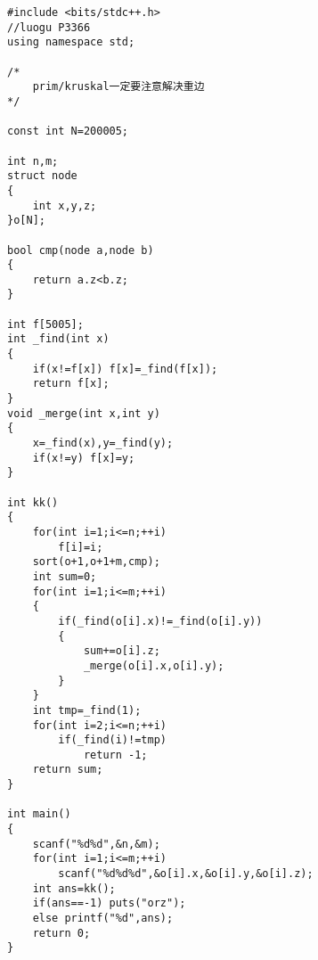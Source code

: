 \begin{lstlisting}
#include <bits/stdc++.h>
//luogu P3366
using namespace std;

/*
	prim/kruskal一定要注意解决重边
*/

const int N=200005;

int n,m;
struct node
{
	int x,y,z;
}o[N];

bool cmp(node a,node b)
{
	return a.z<b.z;
}

int f[5005];
int _find(int x)
{
	if(x!=f[x]) f[x]=_find(f[x]);
	return f[x];
}
void _merge(int x,int y)
{
	x=_find(x),y=_find(y);
	if(x!=y) f[x]=y;
}

int kk()
{
	for(int i=1;i<=n;++i)
		f[i]=i;
	sort(o+1,o+1+m,cmp);
	int sum=0;
	for(int i=1;i<=m;++i)
	{
		if(_find(o[i].x)!=_find(o[i].y))
		{
			sum+=o[i].z;
			_merge(o[i].x,o[i].y);
		}
	}
	int tmp=_find(1);
	for(int i=2;i<=n;++i)
		if(_find(i)!=tmp)
			return -1;
	return sum;
}

int main()
{
	scanf("%d%d",&n,&m);
	for(int i=1;i<=m;++i)
		scanf("%d%d%d",&o[i].x,&o[i].y,&o[i].z);
	int ans=kk();
	if(ans==-1) puts("orz");
	else printf("%d",ans);
	return 0;
}
\end{lstlisting}